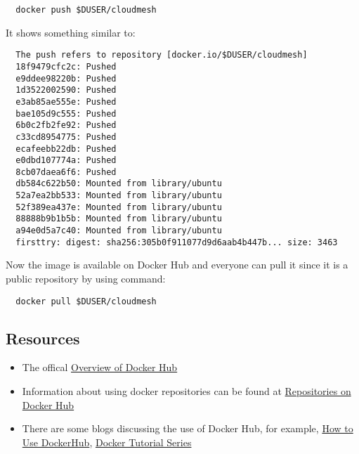 \begin{itemize}
\begin{lstlisting}
  docker push $DUSER/cloudmesh
\end{lstlisting}

  It shows something similar to:

\begin{lstlisting}
  The push refers to repository [docker.io/$DUSER/cloudmesh]
  18f9479cfc2c: Pushed 
  e9ddee98220b: Pushed 
  1d3522002590: Pushed 
  e3ab85ae555e: Pushed 
  bae105d9c555: Pushed 
  6b0c2fb2fe92: Pushed 
  c33cd8954775: Pushed 
  ecafeebb22db: Pushed 
  e0dbd107774a: Pushed 
  8cb07daea6f6: Pushed 
  db584c622b50: Mounted from library/ubuntu 
  52a7ea2bb533: Mounted from library/ubuntu 
  52f389ea437e: Mounted from library/ubuntu 
  88888b9b1b5b: Mounted from library/ubuntu 
  a94e0d5a7c40: Mounted from library/ubuntu 
  firsttry: digest: sha256:305b0f911077d9d6aab4b447b... size: 3463
\end{lstlisting}

  Now the image is available on Docker Hub and everyone can pull it
  since it is a public repository by using command:

\begin{lstlisting}
  docker pull $DUSER/cloudmesh
\end{lstlisting}
\end{itemize}

\subsection{Resources}

\begin{itemize}
\item
  The offical
  \href{https://docs.docker.com/docker-hub/\#use-official-repositories}{Overview
  of Docker Hub}
\item
  Information about using docker repositories can be found at
  \href{https://docs.docker.com/docker-hub/repos/}{Repositories on
  Docker Hub}
\item
  There are some blogs discussing the use of Docker Hub, for example,
  \href{https://www.linux.com/blog/learn/intro-to-linux/2018/1/how-use-dockerhub}{How
  to Use DockerHub},
  \href{https://rominirani.com/docker-tutorial-series-part-4-docker-hub-b51fb545dd8e}{Docker
  Tutorial Series}
\end{itemize}

